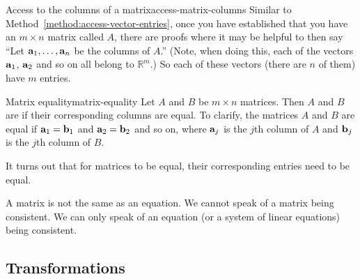 \documentclass{book}
\theoremstyle{ekimcustom}
\newcommand\defn[1]{{\color{blue}{\bf #1}}}
\begin{document}
\begin{bmethod}{Access to the columns of a matrix}{access-matrix-columns}
Similar to Method~\ref{method:access-vector-entries}, once you have established that you have an $m \times n$ matrix called $A$, there are proofs where it may be helpful to then say ``Let ${\bf a}_1, \dots, {\bf a}_n$ be the columns of $A$.'' (Note, when doing this, each of the vectors ${\bf a}_1$, ${\bf a}_2$ and so on all belong to $\mathbb{R}^m$.) So each of these vectors (there are $n$ of them) have $m$ entries.
\end{bmethod}
 
\begin{bdefinition}{Matrix equality}{matrix-equality}
Let $A$ and $B$ be $m \times n$ matrices. Then $A$ and $B$ are \defn{equal} if their corresponding columns are equal. To clarify, the matrices $A$ and $B$ are equal if ${\bf a}_1 = {\bf b}_1$ and ${\bf a}_2 = {\bf b}_2$ and so on, where ${\bf a}_j$ is the $j$th column of $A$ and ${\bf b}_j$ is the $j$th column of $B$.
\end{bdefinition}
It turns out that for matrices to be equal, their corresponding entries need to be equal.

\begin{bwarning}{}{}
A matrix is not the same as an equation. We cannot speak of a matrix being consistent. We can only speak of an equation (or a system of linear equations) being consistent.
\end{bwarning}

%
%
%

\subsection{Transformations}
\end{document}
